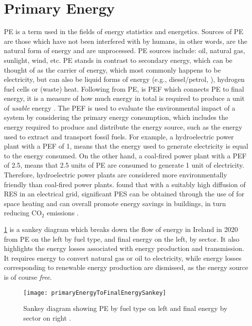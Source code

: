 \section{Primary Energy}\label{sec:primaryenergy}
\ac{PE} is a term used in the fields of energy statistics and energetics. Sources of \ac{PE} are those which have not been interfered with by humans, in other words, are the natural form of energy and are unprocessed. \ac{PE} sources include: oil, natural gas, sunlight, wind, etc. \ac{PE} stands in contrast to secondary energy, which can be thought of as the carrier of energy, which most commonly happens to be electricity, but can also be liquid forms of energy (e.g., diesel/petrol, ), hydrogen fuel cells or (waste) heat. Following from \ac{PE}, is \ac{PEF} which connects \ac{PE} to final energy, it is a measure of how much energy in total is required to produce a unit of \textit{usable} energy \cite{nowak_2018}. The \ac{PEF} is used to evaluate the environmental impact of a system by considering the primary energy consumption, which includes the energy required to produce and distribute the energy source, such as the energy used to extract and transport fossil fuels. For example, a hydroelectric power plant with a \ac{PEF} of 1, means that the energy used to generate electricity is equal to the energy consumed. On the other hand, a coal-fired power plant with a \ac{PEF} of 2.5, means that 2.5 units of \ac{PE} are consumed to generate 1 unit of electricity. Therefore, hydroelectric power plants are considered more environmentally friendly than coal-fired power plants. \cite{bianco_estimation_2017} found that with a suitably high diffusion of \ac{RES} in an electrical grid, significant \ac{PES} can be obtained through the use of \HPs for space heating and can overall promote energy savings in buildings, in turn reducing $\text{CO}_2$ emissions \cite{nowak_2018}.   

\cref{fig:PEtoFinalSankey} is a sankey diagram which breaks down the flow of energy in Ireland in 2020 from \ac{PE} on the left by fuel type, and final energy on the left, by sector. It also highlights the energy losses associated with energy production and transmission. It requires energy to convert natural gas or oil to electricity, while energy losses corresponding to renewable energy production are dismissed, as the energy source is of course \textit{free}. 

\begin{figure}[htb]
    \centering
    \texttt{[image: primaryEnergyToFinalEnergySankey]}
    \caption[\acs{PE} breakdown by fuel type and sector]{Sankey diagram showing \acs{PE} by fuel type on left and final energy by sector on right \cite{seai_energy_2021}.}
    \label{fig:PEtoFinalSankey}
\end{figure}

